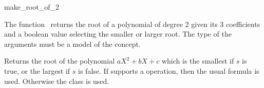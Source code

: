 \begin{ccRefFunction}{make_root_of_2}

\ccDefinition

The function \ccRefName\ returns the root of a polynomial of degree 2
given its 3 coefficients and a boolean value selecting the smaller
or larger root.  The type of the arguments must be a model of the
 concept.



{ Returns the root of the polynomial $aX^2+bX+c$ which is the smallest if
$s$ is true, or the largest if $s$ is false.   If  supports a
 operation, then the usual formula is used.  Otherwise
the  class is used.
}

\ccSeeAlso
{}\\

\end{ccRefFunction}

